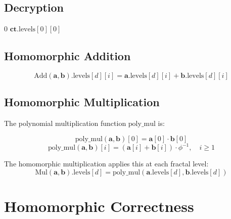 \documentclass[11pt,a4paper]{article}
\theoremstyle{remark}
\DeclareMathOperator{\Dec}{Dec}
\begin{document}
\subsection{Decryption}

\begin{algorithm}[H]
\caption{$\Dec(\mathbf{ct})$ — TrueFHE Decryption}
\begin{algorithmic}[1]
    \State \Return $0$
\EndIf
\State \Return $\mathbf{ct}.\text{levels}[0][0]$ 
\end{algorithmic}
\end{algorithm}

\subsection{Homomorphic Addition}

\begin{equation}
    \text{Add}(\mathbf{a}, \mathbf{b}).\text{levels}[d][i] = \mathbf{a}.\text{levels}[d][i] + \mathbf{b}.\text{levels}[d][i]
\end{equation}

\subsection{Homomorphic Multiplication}

The polynomial multiplication function $\text{poly\_mul}$ is:

\begin{equation}
    \text{poly\_mul}(\mathbf{a}, \mathbf{b})[0] = \mathbf{a}[0] \cdot \mathbf{b}[0]
\end{equation}
\begin{equation}
    \text{poly\_mul}(\mathbf{a}, \mathbf{b})[i] = (\mathbf{a}[i] + \mathbf{b}[i]) \cdot \phi^{-1}, \quad i \geq 1
\end{equation}

The homomorphic multiplication applies this at each fractal level:
\begin{equation}
    \text{Mul}(\mathbf{a}, \mathbf{b}).\text{levels}[d] = \text{poly\_mul}(\mathbf{a}.\text{levels}[d], \mathbf{b}.\text{levels}[d])
\end{equation}

\section{Homomorphic Correctness}
\end{document}
